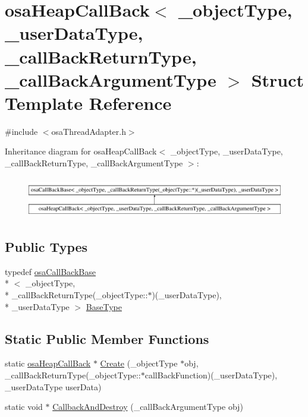 \hypertarget{structosa_heap_call_back}{\section{osa\-Heap\-Call\-Back$<$ \-\_\-object\-Type, \-\_\-user\-Data\-Type, \-\_\-call\-Back\-Return\-Type, \-\_\-call\-Back\-Argument\-Type $>$ Struct Template Reference}
\label{structosa_heap_call_back}
}


{\ttfamily \#include $<$osa\-Thread\-Adapter.\-h$>$}

Inheritance diagram for osa\-Heap\-Call\-Back$<$ \-\_\-object\-Type, \-\_\-user\-Data\-Type, \-\_\-call\-Back\-Return\-Type, \-\_\-call\-Back\-Argument\-Type $>$\-:\begin{figure}[H]
\begin{center}
\leavevmode
\includegraphics[height=1.809370cm]{d0/dbc/structosa_heap_call_back}
\end{center}
\end{figure}
\subsection*{Public Types}
\begin{DoxyCompactItemize}
\item 
typedef \hyperlink{structosa_call_back_base}{osa\-Call\-Back\-Base}\\*
$<$ \-\_\-object\-Type, \\*
\-\_\-call\-Back\-Return\-Type(\-\_\-object\-Type\-::$\ast$)(\-\_\-user\-Data\-Type), \\*
\-\_\-user\-Data\-Type $>$ \hyperlink{structosa_heap_call_back_a5ae1d7cd50191ab6f2026bf10b0fc3b5}{Base\-Type}
\end{DoxyCompactItemize}
\subsection*{Static Public Member Functions}
\begin{DoxyCompactItemize}
\item 
static \hyperlink{structosa_heap_call_back}{osa\-Heap\-Call\-Back} $\ast$ \hyperlink{structosa_heap_call_back_abcd4698c3b9f695d85ea2d253a8e8f27}{Create} (\-\_\-object\-Type $\ast$obj, \-\_\-call\-Back\-Return\-Type(\-\_\-object\-Type\-::$\ast$call\-Back\-Function)(\-\_\-user\-Data\-Type), \-\_\-user\-Data\-Type user\-Data)
\item 
static void $\ast$ \hyperlink{structosa_heap_call_back_a1ae4eb6d5a8f2f0e28ab2ac89756f54d}{Callback\-And\-Destroy} (\-\_\-call\-Back\-Argument\-Type obj)
\end{DoxyCompactItemize}
